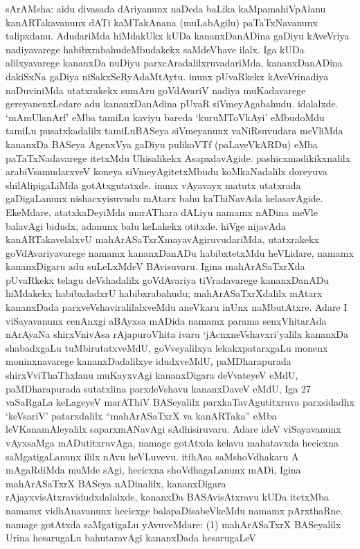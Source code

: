 \documentclass[11pt,a4size]{article}
\begin{document}
sArAMsha: aidu divasada dAriyanunx naDeda baLika kaMpamahiVpAlanu
kanARTakavanunx dATi kaMTakAnana (muLabAgilu) paTaTxNavanunx
talipxdanu. AdudariMda hiMdakUkx kUDa kananxDanADina gaDiyu kAveVriya
nadiyavarege habibxrabahudeMbudakekx saMdeVhave ilalx. Iga kUDa
alilxyavarege kananxDa nuDiyu parxcAradalilxruvadariMda,
kananxDanADina dakiSxNa gaDiya niSakxSeRyAdaMtAytu. inunx pUvaRkekx
kAveVrinadiya naDuviniMda utatxrakekx sumAru goVdAvariV nadiya
muKadavarege gereyanenxLedare adu kananxDanAdina pUvaR
siVmeyAgabahudu. idalalxde. `mAmUlanArf' eMba tamiLu kaviyu bareda
`kuruMToVkAyi' eMbudoMdu tamiLu pusatxkadalilx tamiLuBASeya
siVmeyanunx vaNiRsuvudara meVliMda kananxDa BASeya AgenxVya gaDiyu
pulikoVTf (paLaveVkARDu) eMba paTaTxNadavarege itetxMdu Uhisalikekx
AsapxdavAgide. pashicxmadikikxnalilx arabiVsamudarxveV koneya
siVmeyAgitetxMbudu koMkaNadalilx doreyuva shilAlipigaLiMda
gotAtxgutatxde. inunx vAyavayx matutx utatxrada gaDigaLanunx
nishacxyisuvudu mAtarx bahu kaThiNavAda kelasavAgide. EkeMdare,
atatxkaDeyiMda marAThara dALiyu namamx nADina meVle balavAgi bidudx,
adanunx balu keLakekx otitxde. hiVge nijavAda kanARTakavelalxvU
mahArASaTxrXmayavAgiruvudariMda, utatxrakekx goVdAvariyavarege namamx
kananxDanADu habibxtetxMdu heVLidare, namamx kananxDigaru adu
suLeLxMdeV BAvisuvaru. Igina mahArASaTxrXda pUvaRkekx telagu
deVshadalilx goVdAvariya tiVradavarege kananxDanADu hiMdakekx
habibxdadxrU habibxrabahudu; mahArASaTxrXdalilx mAtarx kananxDada
parxveVshaviralilalxveMdu aneVkaru inUnx naMbutAtxre. Adare I
viSayavanunx cenAnxgi aBAyxsa mADida namamx parama senxVhitarAda
nArAyaNa shirxVnivAsa rAjapuroVhita ivaru `jAcnxneVshavxri'yalilx
kananxDa shabadxgaLu tuMbirutatxveMdU, goVveyalilxya lekakxpatarxgaLu
monenx moninxnavarege kananxDadalilxye idudxveMdU, paMDharapurada
shirxVviThaThxlanu muKayxvAgi kananxDigara deVvateyeV eMdU,
paMDharapurada sutatxlina parxdeVshavu kananxDaveV eMdU, Iga 27
vaSaRgaLa keLageyeV marAThiV BASeyalilx parxkaTavAgutitxruva
parxsidadhx `keVsariV' patarxdalilx ``mahArASaTxrX va kanARTaka'' eMba
leVKanamAleyalilx saparxmANavAgi sAdhisiruvaru. Adare ideV
viSayavanunx vAyxsaMga mADutitxruvAga, namage gotAtxda kelavu
mahatavxda hecicxna saMgatigaLanunx ililx nAvu heVLuvevu. itihAsa
saMshoVdhakaru A mAgaRdiMda muMde sAgi, hecicxna shoVdhagaLanunx mADi,
Igina mahArASaTxrX BASeya nADinalilx, kananxDigara
rAjayxvisAtxravidudxdalalxde, kananxDa BASAvisAtxravu kUDa itetxMba
namamx vidhAnavanunx hecicxge balapaDisabeVkeMdu namamx
pArxthaRne. namage gotAtxda saMgatigaLu yAvuveMdare: (1) mahArASaTxrX
BASeyalilx Urina hesarugaLu bahutaravAgi kananxDada hesarugaLeV
\end{document}
